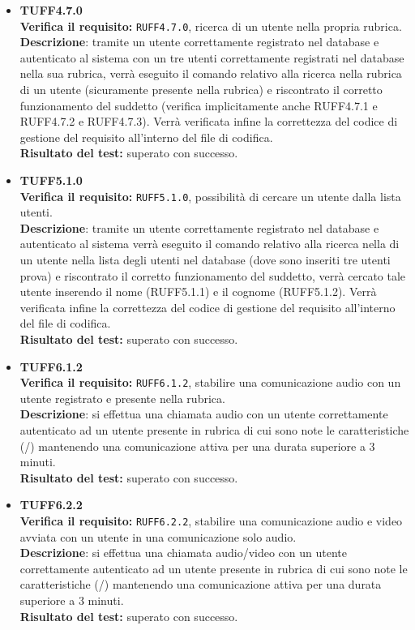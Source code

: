 \begin{itemize}
\item \textbf{TUFF4.7.0}\\ 
\textbf{Verifica il requisito:} \texttt{RUFF4.7.0}, ricerca di un utente nella propria rubrica.\\
\textbf{Descrizione}: tramite un utente  correttamente registrato nel database e autenticato al sistema con un tre utenti  correttamente registrati nel database nella sua rubrica, verrà eseguito il comando relativo alla ricerca nella rubrica di un utente (sicuramente presente nella rubrica) e riscontrato il corretto funzionamento del suddetto (verifica implicitamente anche RUFF4.7.1 e RUFF4.7.2 e RUFF4.7.3). Verrà verificata infine la correttezza del codice di gestione del requisito all'interno del file di codifica.\\
\textbf{Risultato del test:} superato con successo.

\item \textbf{TUFF5.1.0}\\
\textbf{Verifica il requisito:} \texttt{RUFF5.1.0}, possibilità di cercare un utente dalla lista utenti.\\
\textbf{Descrizione}: tramite un utente  correttamente registrato nel database e autenticato al sistema verrà eseguito il comando relativo alla ricerca nella di un utente nella lista degli utenti nel database (dove sono inseriti tre utenti prova) e riscontrato il corretto funzionamento del suddetto, verrà cercato tale utente inserendo il nome (RUFF5.1.1) e il cognome (RUFF5.1.2). Verrà verificata infine la correttezza del codice di gestione del requisito all'interno del file di codifica.\\
\textbf{Risultato del test:} superato con successo.

\item \textbf{TUFF6.1.2}\\ 
\textbf{Verifica il requisito:} \texttt{RUFF6.1.2}, stabilire una comunicazione audio con un utente registrato e presente nella rubrica.\\
\textbf{Descrizione}: si effettua una chiamata audio con un utente  correttamente autenticato ad un utente  presente in rubrica di cui sono note le caratteristiche (/) mantenendo una comunicazione attiva per una durata superiore a 3 minuti.\\
\textbf{Risultato del test:} superato con successo.

\item \textbf{TUFF6.2.2}\\
\textbf{Verifica il requisito:} \texttt{RUFF6.2.2}, stabilire una comunicazione audio e video avviata con un utente in una comunicazione solo audio.\\
\textbf{Descrizione}: si effettua una chiamata audio/video con un utente  correttamente autenticato ad un utente  presente in rubrica di cui sono note le caratteristiche (/) mantenendo una comunicazione attiva per una durata superiore a 3 minuti.\\
\textbf{Risultato del test:} superato con successo.


\end{itemize}
